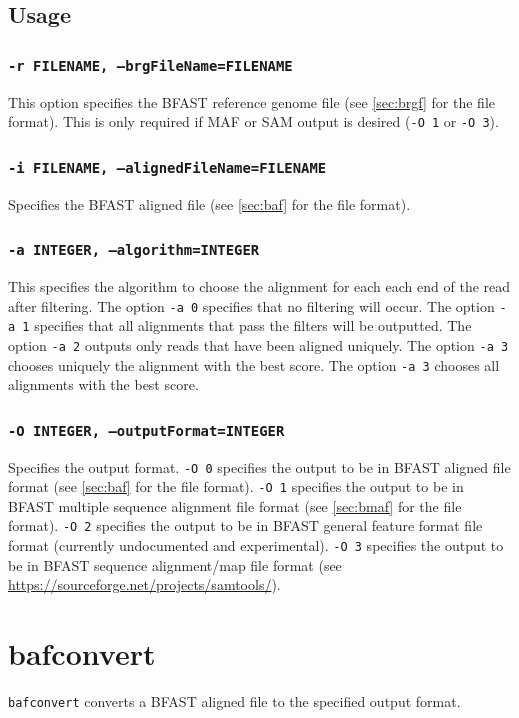 \documentclass[a4paper,12pt]{book}
\newcommand{\TT}[1]{{\tt #1}} %
\newcommand{\BRGF}{BFAST reference genome file} %
\newcommand{\BAF}{BFAST aligned file} %
\newcommand{\BMAF}{BFAST multiple sequence alignment file} %
\newcommand{\BGFFF}{BFAST general feature format file} %
\newcommand{\BSAMF}{BFAST sequence alignment/map file} %
\begin{document}
\subsection{Usage}

\subsubsection{\TT{-r FILENAME, --brgFileName=FILENAME}}
This option specifies the \BRGF{} (see \autoref{sec:brgf} for the file format).
This is only required if MAF or SAM output is desired (\TT{-O 1} or \TT{-O 3}).

\subsubsection{\TT{-i FILENAME, --alignedFileName=FILENAME}}
Specifies the \BAF{} (see \autoref{sec:baf} for the file format).

\subsubsection{\TT{-a INTEGER, --algorithm=INTEGER}}
This specifies the algorithm to choose the alignment for each each end of the read after filtering.
The option \TT{-a 0} specifies that no filtering will occur.
The option \TT{-a 1} specifies that all alignments that pass the filters will be outputted.
The option \TT{-a 2} outputs only reads that have been aligned uniquely.
The option \TT{-a 3} chooses uniquely the alignment with the best score.
The option \TT{-a 3} chooses all alignments with the best score.

\subsubsection{\TT{-O INTEGER, --outputFormat=INTEGER}}
Specifies the output format.
\TT{-O 0} specifies the output to be in \BAF{} format (see \autoref{sec:baf} for the file format).
\TT{-O 1} specifies the output to be in \BMAF{} format (see \autoref{sec:bmaf} for the file format).
\TT{-O 2} specifies the output to be in \BGFFF{} format (currently undocumented and experimental).
\TT{-O 3} specifies the output to be in \BSAMF{} format (see \url{https://sourceforge.net/projects/samtools/}).


\section{bafconvert}
\label{sec:bafconvert}
\TT{bafconvert} converts a \BAF{} to the specified output format.
\end{document}
